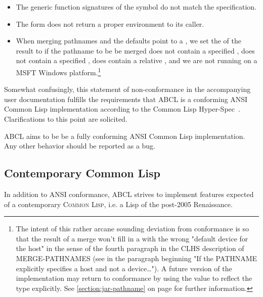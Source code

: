 \documentclass[10pt]{book}
\begin{document}
\begin{itemize}
\item The generic function signatures of the 
  symbol do not match the specification.
\item The  form does not return a proper
   environment to its caller.
\item When merging pathnames and the defaults point to a
  , we set the  of the result to
   if the pathname to be be merged does not contain
  a specified , does not contain a specified ,
  does contain a relative , and we are not running on
  a \textsc{MSFT} Windows platform.\footnote{The intent of this rather
  arcane sounding deviation from conformance is so that the result of
  a merge won't fill in a  with the wrong "default device
  for the host" in the sense of the fourth paragraph in the
  \textsc{CLHS} description of MERGE-PATHNAMES (see in \cite{CLHS} the
  paragraph beginning "If the PATHNAME explicitly specifies a host and
  not a device…").  A future version of the implementation may return
  to conformance by using the  value to reflect the type
  explicitly. See \ref{section:jar-pathname} on page
  \pageref{section:jar-pathname} for further information.}

\end{itemize}

Somewhat confusingly, this statement of non-conformance in the
accompanying user documentation fulfills the requirements that
\textsc{ABCL} is a conforming ANSI Common Lisp implementation according
to the Common Lisp Hyper-Spec~\cite{CLHS}.  Clarifications to this point
are solicited.

\textsc{ABCL} aims to be be a fully conforming \textsc{ANSI} Common
Lisp implementation.  Any other behavior should be reported as a bug.

\subsection{Contemporary Common Lisp}
In addition to \textsc{ANSI} conformance, \textsc{ABCL} strives to implement
features expected of a contemporary \textsc{Common Lisp}, i.e. a Lisp of the
post-2005 Renaissance.
\end{document}

